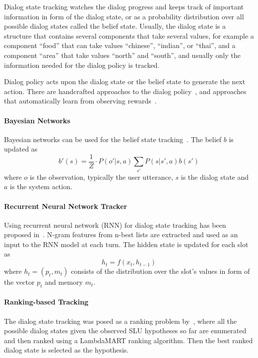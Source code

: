 \documentclass[runningheads,a4paper]{llncs}
\begin{document}
Dialog state tracking watches the dialog progress and keeps track of important information in form of the dialog state, or as a probability distribution over all possible dialog states called the belief state. Usually, the dialog state is a structure that contains several components that take several values, for example a component ``food'' that can take values ``chinese'', ``indian'', or ``thai'', and a component ``area'' that take values ``north'' and ``south'', and usually only the information needed for the dialog policy is tracked.

Dialog policy acts upon the dialog state or the belief state to generate the next action. There are handcrafted approaches to the dialog policy~\cite{pieraccini2005we,skantze2008galatea}, and approaches that automatically learn from observing rewards~\cite{levin2000stochastic,walker2000application,lemon2006isu,thomson2010bayesian}.

\paragraph*{Bayesian Networks}
Bayesian networks can be used for the belief state tracking~\cite{pulman1996conversational,williams2007applying,bui2006tractable,thomson2010bayesian}. The belief $b$ is updated as
$$b'(s)=\frac{1}{Z} \cdot P(o'|s,a)\sum_{s'}P(s|s',a)b(s')$$
where $o$ is the observation, typically the user utterance, $s$ is the dialog state and $a$ is the system action.

\paragraph*{Recurrent Neural Network Tracker}
Using recurrent neural network (RNN) for dialog state tracking has been proposed in~\cite{henderson2014word,henderson2013deep}. N-gram features from n-best lists are extracted and used as an input to the RNN model at each turn. The hidden state is updated for each slot as
$$h_t=f(x_t, h_{t-1})$$
where $h_t=(p_t, m_t)$ consists of the distribution over the slot's values in form of the vector $p_t$ and memory $m_t$.

\paragraph*{Ranking-based Tracking}
The dialog state tracking was posed as a ranking problem by~\cite{williams2014web}, where all the possible dialog states given the observed SLU hypotheses so far are enumerated and then ranked using a LambdaMART ranking algorithm. Then the best ranked dialog state is selected as the hypothesis.
\end{document}
